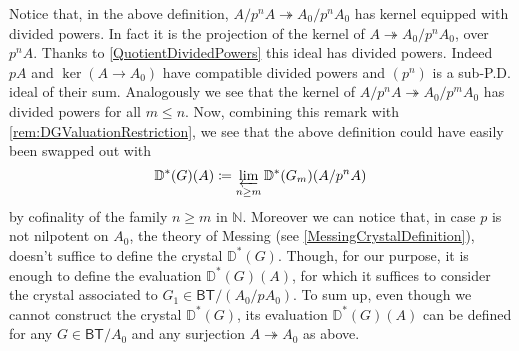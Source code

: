 \begin{rem}[]\label{rem:NonNilpotentCrystalEvaluation}
	Notice that, in the above definition, $A/p^nA \twoheadrightarrow A_0/p^nA_0$
	has kernel equipped with divided powers.
	In fact it is the projection of the kernel of $A \twoheadrightarrow A_0/p^nA_0$, over
	$p^nA$.
	Thanks to \cref{QuotientDividedPowers} this ideal has divided powers.
	Indeed $pA$ and $\ker (A \to A_0)$ have compatible
	divided powers and \((p^n)\) is a sub-P.D. ideal of their sum.
	Analogously we see that the kernel of $A/p^nA \twoheadrightarrow A_0/p^mA_0$
	has divided powers for all $m \leq n$.
	Now, combining this remark with \cref{rem:DGValuationRestriction},
	we see that the above definition could have easily been swapped out with
	\begin{equation*}
		\mathbb{D}^*(G)(A) \coloneqq
		\varprojlim_{n \geq m} \mathbb{D}^*(G_m)(A/p^nA)
	\end{equation*}
	by cofinality of the family $n \geq m$ in $\mathbb{N}$.
	Moreover we can notice that, in case $p$ is not nilpotent
	on $A_0$, the theory of Messing (see \cref{MessingCrystalDefinition}),
	doesn't suffice to define the crystal $\mathbb{D}^*(G)$.
	Though, for our purpose, it is enough to define the evaluation $\mathbb{D}^*(G)(A)$,
	for which it suffices to consider the crystal associated to $G_1 \in \mathsf{BT}/ (A_0/pA_0)$.
	To sum up, even though we cannot construct the crystal
	\(\mathbb{D}^*(G)\), its evaluation \(\mathbb{D}^*(G)(A)\)
	can be defined for any $G \in \mathsf{BT}/A_0$ and any surjection
	$A \twoheadrightarrow A_0$ as above.
\end{rem}


